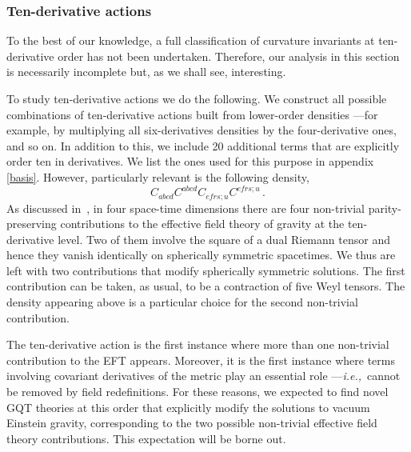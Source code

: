 \documentclass[11pt]{article}
\newcommand{\be}{\begin{equation}}
\newcommand{\ee}{\end{equation} }
\newcommand{\ie}{{\it i.e.,}\ }
\newcommand{\comment}[1]{{\bf [[[#1]]]}}
\begin{document}
{%

\subsubsection{Ten-derivative actions}

To the best of our knowledge, a full classification of curvature invariants at ten-derivative order has not been undertaken. Therefore, our analysis in this section is necessarily incomplete but, as we shall see, interesting.

To study ten-derivative actions we do the following. We construct all possible combinations of ten-derivative actions built from lower-order densities ---for example, by multiplying all six-derivatives densities by the four-derivative ones, and so on. In addition to this, we include 20 additional terms that are explicitly order ten in derivatives. We list the ones used for this purpose in appendix \ref{basis}. However, particularly relevant is the following density,
\be 
C_{abcd} C^{abcd} C_{ef rs ;u} C^{ef rs ;u} \, .
\ee
As discussed in~\cite{Ruhdorfer:2019qmk,Li:2023wdz}, in four space-time dimensions there are four non-trivial parity-preserving contributions to the effective field theory of gravity at the ten-derivative level. Two of them involve the square of a dual Riemann tensor and hence they vanish identically on spherically symmetric spacetimes. We thus are left with two contributions that modify spherically symmetric solutions. The first contribution can be taken, as usual, to be a contraction of five Weyl tensors. The density appearing above is a particular choice for the second non-trivial contribution. 

The ten-derivative action is the first instance where more than one non-trivial contribution to the EFT appears. Moreover, it is the first instance where terms involving covariant derivatives of the metric play an essential role ---\ie cannot be removed by field redefinitions. For these reasons, we expected to find novel GQT theories at this order that explicitly modify the solutions to vacuum Einstein gravity, corresponding to the two possible non-trivial effective field theory contributions. This expectation will be borne out.  

}
\end{document}
